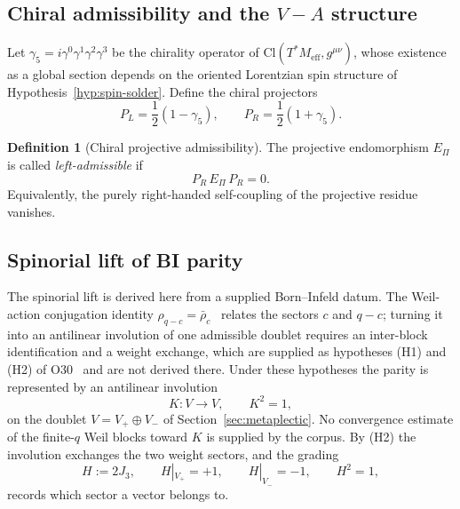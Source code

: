 \documentclass[11pt,a4paper]{article}
\theoremstyle{definition}
\newtheorem{definition}[theorem]{Definition}
\theoremstyle{remark}
\begin{document}
  \subsection{Chiral admissibility and the \texorpdfstring{$V{-}A$}{V-A} structure}
    \label{ssec:chiral-admissibility}

    Let $\gamma_5 = i \gamma^0 \gamma^1 \gamma^2 \gamma^3$ be the chirality operator
    of $\mathrm{Cl}(T^* M_{\mathrm{eff}}, g^{\mu\nu})$, whose existence as a global
    section depends on the oriented Lorentzian spin structure of Hypothesis~\ref{hyp:spin-solder}.
    Define the chiral projectors
    \[
      P_L = \frac{1}{2}(1 - \gamma_5),
      \qquad
      P_R = \frac{1}{2}(1 + \gamma_5).
    \]

    \begin{definition}[Chiral projective admissibility]
      \label{def:chiral-admissibility}
      The projective endomorphism $E_\Pi$ is called \emph{left-admissible} if
      \begin{equation}
        \label{eq:left-admissible}
        P_R \, E_\Pi \, P_R = 0 .
      \end{equation}
      Equivalently, the purely right-handed self-coupling of the projective residue
      vanishes.
    \end{definition}

  \subsection{Spinorial lift of BI parity}
    \label{ssec:proof-bi-left}

    The spinorial lift is derived here from a supplied Born--Infeld datum.
    The Weil-action conjugation identity $\rho_{q-c} = \bar\rho_c$~\cite{Beau2026a22} relates the
    sectors $c$ and $q-c$; turning it into an antilinear involution of one admissible doublet requires
    an inter-block identification and a weight exchange, which are supplied as hypotheses (H1) and (H2)
    of O30~\cite{Beau2026a34} and are not derived there.
    Under these hypotheses the parity is represented by an antilinear involution
    \[
      K : V \longrightarrow V,
      \qquad
      K^2 = 1 ,
    \]
    on the doublet $V = V_+ \oplus V_-$ of Section~\ref{sec:metaplectic}.
    No convergence estimate of the finite-$q$ Weil blocks toward $K$ is supplied by the corpus.
    By (H2) the involution exchanges the two weight sectors, and the grading
    \[
      H := 2 J_3,
      \qquad
      H|_{V_+} = +1,
      \qquad
      H|_{V_-} = -1,
      \qquad
      H^2 = 1 ,
    \]
    records which sector a vector belongs to.
\end{document}

